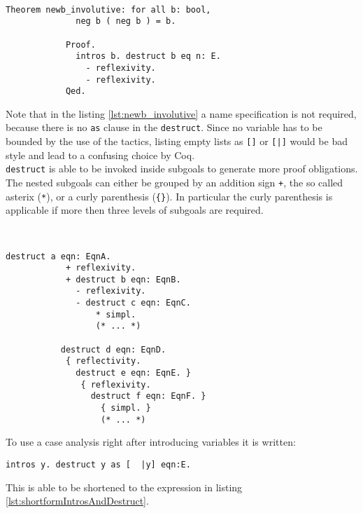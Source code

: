 		\begin{example} ~\\\vspace{-10mm}
		  \begin{lstlisting}[caption=\lstinline!newb_invloutive!, label=lst:newb_involutive]
		  	Theorem newb_involutive: for all b: bool,
		  	  neg b ( neg b ) = b.
		  	  
		  	Proof. 
		  	  intros b. destruct b eq n: E.
		  	    - reflexivity. 
		  	    - reflexivity. 
		  	Qed.  	   
		  \end{lstlisting}
		\end{example}	 
		 Note that in the listing \ref{lst:newb_involutive} a name specification is not required, because there is no \lstinline!as! clause in the \lstinline!destruct!.
		 Since no variable has to be bounded by the use of the tactics, listing empty lists as \lstinline![]! or \lstinline![|]! would be bad style and lead to a confusing choice by Coq.\\	 
		 \lstinline!destruct! is able to be invoked inside subgoals to generate more proof obligations.
		  The nested subgoals can either be grouped by an addition sign \lstinline!+!, the so called asterix (\lstinline!*!), or a curly parenthesis (\lstinline!{}!). 
		  In particular the curly parenthesis is applicable if more then three levels of subgoals are required. 
		  \begin{example} 
		  ~\\\vspace{-10mm}
		  \begin{lstlisting}[caption = syntax of nested \lstinline!destruct! expressions]
		  destruct a eqn: EqnA.
		    + reflexivity.
		    + destruct b eqn: EqnB.
		      - reflexivity.
		      - destruct c eqn: EqnC.
		          * simpl. 
		          (* ... *)       
		  
		   destruct d eqn: EqnD.
		    { reflectivity.
		      destruct e eqn: EqnE. } 
		       { reflexivity.
		         destruct f eqn: EqnF. } 
		           { simpl. }
		           (* ... *)   
		   \end{lstlisting}
		   \end{example}	 
		  To use a case analysis right after introducing variables it is written:
		  \begin{lstlisting}[caption = \lstinline!intros! and \lstinline!destruct!]
		  	intros y. destruct y as [  |y] eqn:E.
		  \end{lstlisting}	
		  This is able to be shortened to the expression in listing \ref{lst:shortformIntrosAndDestruct}.  

